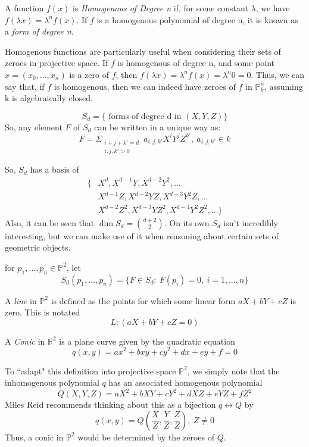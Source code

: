\begin{mydef}
A function $f(x)$ is \emph{Homogenous of Degree n} if, for some 
constant $\lambda$, we have $f(\lambda x) = \lambda ^n f(x)$.
If $f$ is a homogenous polynomial of degree n, it is known as a \emph{form of degree n}.
\end{mydef}

Homogenous functions are particularly useful when considering their
sets of zeroes in projective space. If $f$ is homogenous of degree
n, and some point $x = (x_0, ..., x_n)$ is a zero of $f$, then
$f(\lambda x) = \lambda^n f(x) = \lambda^n 0 = 0$. Thus, we can say
that, if $f$ is homogenous, then we can indeed have zeroes of $f$ in $\mathbb{P}^n_k$,
assuming k is algebraically closed.

\begin{mydef}
\[
S_d = \{\text{ forms of degree d in $(X, Y, Z)$}\}
\]
So, any element $F$ of $S_d$ can be written in a unique way as:
\[
F = \Sigma _{\substack{i+j+k'=d \\ i,j,k' > 0}}~a_{i,j,k'} X^i Y^j Z^{k'},~a_{i,j,k'} \in k
\]
\end{mydef}
So, $S_d$ has a basis of 
\begin{align*}
\{&X^d, X^{d-1}Y, X^{d-2}Y^2, \dots\\
&X^{d-1}Z, X^{d-2}YZ, X^{d-3}Y^2Z, \dots\\
&X^{d-2}Z^2, X^{d-3}YZ^2, X^{d-4}Y^2Z^2, \dots\}
\end{align*}
Also, it can be seen that $\dim S_d = {d+2 \choose 2}$. On its own
$S_d$ isn't incredibly interesting, but we can make use of it when
reasoning about certain sets of geometric objects.

\begin{mydef}
for $p_1, \dots, p_n \in \mathbb{P}^2$, let
\[
	S_d(p_1, \dots, p_n) = \{ F \in S_d :~F(p_i) = 0,~i=1,\dots,n\}
\]
\end{mydef}

\begin{mydef}
A \emph{line} in $\mathbb{P}^2$ is defined as the points for which
some linear form $aX + bY + cZ$ is zero. This is notated
\[
L:(aX+bY+cZ=0)
\]
\end{mydef}

\begin{mydef}
A \emph{Conic} in $\mathbb{R}^2$ is a plane curve given by the quadratic
equation
\[
q(x,y) = ax^2 + bxy + cy^2 + dx + ey + f = 0
\]
\end{mydef}

To ``adapt" this definition into projective space $\mathbb{P}^2$, we simply
note that the inhomogenous polynomial $q$ has an associated
homogenous polynomial 
\[
Q(X,Y,Z) = aX^2 + bXY + cY^2 + dXZ + eYZ + fZ^2
\]
Miles Reid recommends thinking about this as a bijection $q \leftrightarrow Q$ by
\[
q(x,y) = Q(\frac{X}{Z},\frac{Y}{Z},\frac{Z}{Z}),~Z\ne 0
\]
Thus, a conic in $\mathbb{P}^2$ would be determined by the zeroes of $Q$.

